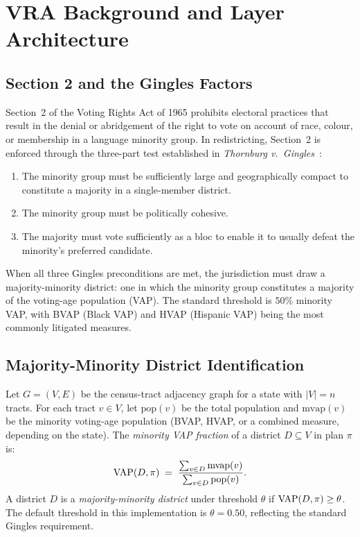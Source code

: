 \section{VRA Background and Layer Architecture}
\label{sec:background}

\subsection{Section 2 and the Gingles Factors}

Section~2 of the Voting Rights Act of 1965 prohibits electoral practices that
result in the denial or abridgement of the right to vote on account of race,
colour, or membership in a language minority group.
In redistricting, Section~2 is enforced through the three-part test established
in \emph{Thornburg v.\ Gingles}~\citep{gingles1986}:
\begin{enumerate}
  \item The minority group must be sufficiently large and geographically compact
        to constitute a majority in a single-member district.
  \item The minority group must be politically cohesive.
  \item The majority must vote sufficiently as a bloc to enable it to usually
        defeat the minority's preferred candidate.
\end{enumerate}
When all three Gingles preconditions are met, the jurisdiction must draw a
majority-minority district: one in which the minority group constitutes a
majority of the voting-age population (VAP).
The standard threshold is $50\%$ minority VAP, with BVAP (Black VAP) and
HVAP (Hispanic VAP) being the most commonly litigated measures.

\subsection{Majority-Minority District Identification}

Let $G = (V, E)$ be the census-tract adjacency graph for a state with $|V| = n$
tracts.
For each tract $v \in V$, let $\mathrm{pop}(v)$ be the total population and
$\mathrm{mvap}(v)$ be the minority voting-age population (BVAP, HVAP, or a
combined measure, depending on the state).
The \emph{minority VAP fraction} of a district $D \subseteq V$ in plan $\pi$ is:
\[
  \mathrm{VAP}(D, \pi) \;=\; \frac{\sum_{v \in D} \mathrm{mvap}(v)}{\sum_{v \in D}
  \mathrm{pop}(v)}.
\]
A district $D$ is a \emph{majority-minority district} under threshold $\theta$
if $\mathrm{VAP}(D, \pi) \geq \theta$.
The default threshold in this implementation is $\theta = 0.50$, reflecting
the standard Gingles requirement.

